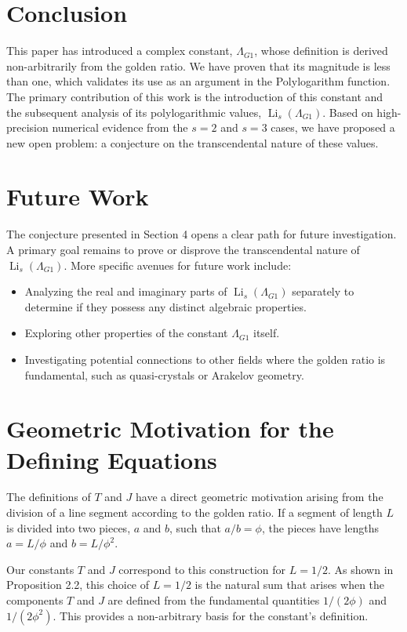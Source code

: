 \documentclass{amsart}
\theoremstyle{plain}
\theoremstyle{definition}
\theoremstyle{remark}
\DeclareMathOperator{\Li}{Li} %
\newcommand{\LambdaG}{\Lambda_{G1}}
\begin{document}
\section{Conclusion}
This paper has introduced a complex constant, $\LambdaG$, whose definition is derived non-arbitrarily from the golden ratio. We have proven that its magnitude is less than one, which validates its use as an argument in the Polylogarithm function. The primary contribution of this work is the introduction of this constant and the subsequent analysis of its polylogarithmic values, $\Li_s(\LambdaG)$. Based on high-precision numerical evidence from the $s=2$ and $s=3$ cases, we have proposed a new open problem: a conjecture on the transcendental nature of these values.

\section{Future Work}
The conjecture presented in Section 4 opens a clear path for future investigation. A primary goal remains to prove or disprove the transcendental nature of $\Li_s(\LambdaG)$. More specific avenues for future work include:
\begin{itemize}
    \item Analyzing the real and imaginary parts of $\Li_s(\LambdaG)$ separately to determine if they possess any distinct algebraic properties.
    \item Exploring other properties of the constant $\LambdaG$ itself.
    \item Investigating potential connections to other fields where the golden ratio is fundamental, such as quasi-crystals or Arakelov geometry.
\end{itemize}

\appendix
\section{Geometric Motivation for the Defining Equations}
\label{app:A}
The definitions of $T$ and $J$ have a direct geometric motivation arising from the division of a line segment according to the golden ratio. If a segment of length $L$ is divided into two pieces, $a$ and $b$, such that $a/b = \phi$, the pieces have lengths $a=L/\phi$ and $b=L/\phi^2$.

Our constants $T$ and $J$ correspond to this construction for $L=1/2$. As shown in Proposition 2.2, this choice of $L=1/2$ is the natural sum that arises when the components $T$ and $J$ are defined from the fundamental quantities $1/(2\phi)$ and $1/(2\phi^2)$. This provides a non-arbitrary basis for the constant's definition.
\end{document}
